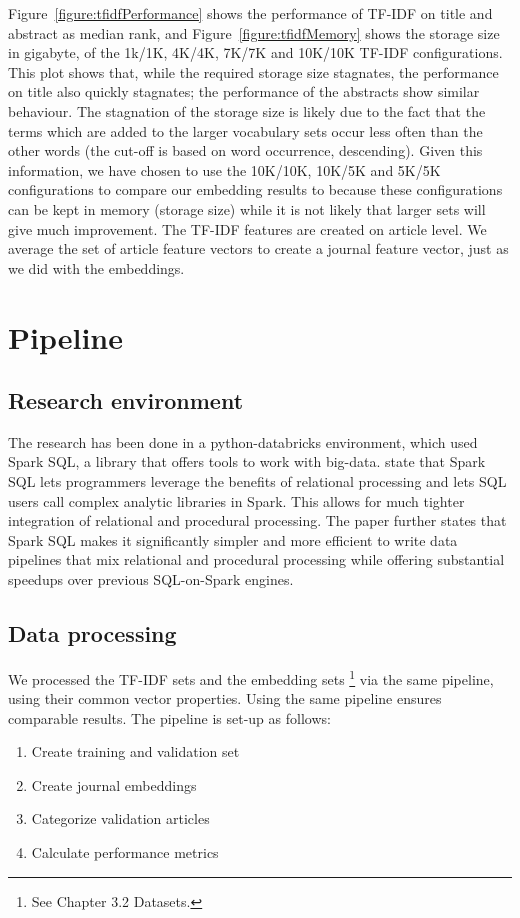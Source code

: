 \documentclass[../../Thesis.tex]{subfiles}
\begin{document}
\FloatBarrier
Figure~\ref{figure:tfidfPerformance} shows the performance of TF-IDF on title and abstract as median rank, and Figure~\ref{figure:tfidfMemory} shows the storage size in gigabyte, of the 1k/1K, 4K/4K, 7K/7K and 10K/10K TF-IDF configurations. This plot shows that, while the required storage size stagnates, the performance on title also quickly stagnates; the performance of the abstracts show similar behaviour. The stagnation of the storage size is likely due to the fact that the terms which are added to the larger vocabulary sets occur less often than the other words (the cut-off is based on word occurrence, descending). Given this information, we have chosen to use the 10K/10K, 10K/5K and 5K/5K configurations to compare our embedding results to because these configurations can be kept in memory (storage size) while it is not likely that larger sets will give much improvement. The TF-IDF features are created on article level. We average the set of article feature vectors to create a journal feature vector, just as we did with the embeddings. 
\section{Pipeline}
\subsection{Research environment}
The research has been done in a python-databricks environment, which used Spark SQL, a library that offers tools to work with big-data. \citet{armbrust2015spark} state that Spark SQL lets programmers leverage the benefits of relational processing and lets SQL users call complex analytic libraries in Spark. This allows for much tighter integration of relational and procedural processing. The paper further states that Spark SQL makes it significantly simpler and more efficient to write data pipelines that mix relational and procedural processing while offering substantial speedups over previous SQL-on-Spark engines.\\
\subsection{Data processing}
We processed the TF-IDF sets and the embedding sets \footnote{See Chapter 3.2 Datasets.} via the same pipeline, using their common vector properties. Using the same pipeline ensures comparable results. The pipeline is set-up as follows:
\begin{enumerate}
\item{Create training and validation set}
\item{Create journal embeddings}
\item{Categorize validation articles}
\item{Calculate performance metrics}
\end{enumerate}
\end{document}
